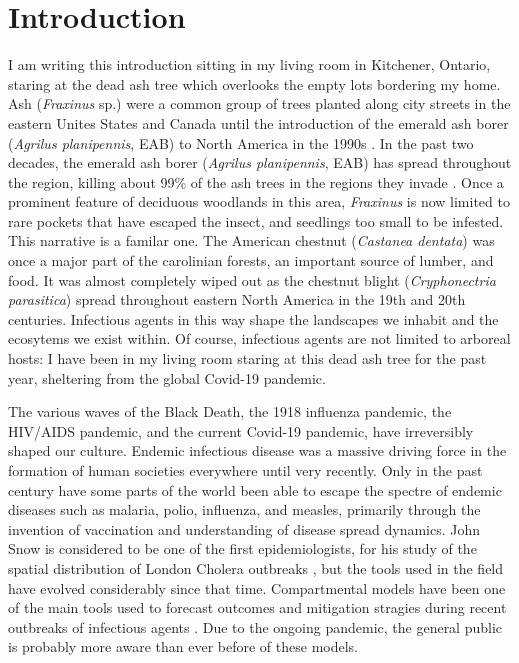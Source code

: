 \chapter{Introduction}

I am writing this introduction sitting in my living room in Kitchener, Ontario, staring at the dead ash tree which overlooks the empty lots bordering my home. Ash (\textit{Fraxinus} sp.) were a common group of trees planted along city streets in the eastern Unites States and Canada until the introduction of the emerald ash borer (\textit{Agrilus planipennis}, EAB) to North America in the 1990s \cite{nrcanmpb}. In the past two decades, the emerald ash borer (\textit{Agrilus planipennis}, EAB) has spread throughout the region, killing about 99\% of the ash trees in the regions they invade \cite{nrcaneab,herms2014emerald}. Once a prominent feature of deciduous woodlands in this area, \textit{Fraxinus} is now limited to rare pockets that have escaped the insect, and seedlings too small to be infested. This narrative is a familar one. The American chestnut (\textit{Castanea dentata}) was once a major part of the carolinian forests, an important source of lumber, and food. It was almost completely wiped out as the chestnut blight (\textit{Cryphonectria parasitica}) spread throughout eastern North America in the 19th and 20th centuries. Infectious agents in this way shape the landscapes we inhabit and the ecosytems we exist within. Of course, infectious agents are not limited to arboreal hosts: I have been in my living room staring at this dead ash tree for the past year, sheltering from the global Covid-19 pandemic. 

The various waves of the Black Death, the 1918 influenza pandemic, the HIV/AIDS pandemic, and the current Covid-19 pandemic, have irreversibly shaped our culture. Endemic infectious disease was a massive driving force in the formation of human societies everywhere until very recently. Only in the past century have some parts of the world been able to escape the spectre of endemic diseases such as malaria, polio, influenza, and measles, primarily through the invention of vaccination and understanding of disease spread dynamics. John Snow is considered to be one of the first epidemiologists, for his study of the spatial distribution of London Cholera outbreaks \cite{snow1855mode, brauer2019mathematical}, but the tools used in the field have evolved considerably since that time. Compartmental models have been one of the main tools used to forecast outcomes and mitigation stragies during recent outbreaks of infectious agents \cite{brauer2008compartmental}. Due to the ongoing pandemic, the general public is probably more aware than ever before of these models.

